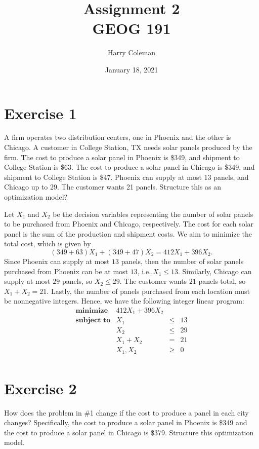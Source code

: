 \documentclass[12pt]{article}
\title{Assignment 2\\
    \large GEOG 191
}
\author{Harry Coleman}
\date{January 18, 2021}
\newenvironment{problem}
    {\begin{lrbox}{\mybox}\begin{minipage}{0.98\textwidth}}
    {\end{minipage}\end{lrbox}\begin{center}\framebox[\textwidth]{\usebox{\mybox}}\end{center}}
\theoremstyle{definition}
\begin{document}
\maketitle

\section*{Exercise 1}
\begin{problem}
    A firm operates two distribution centers, one in Phoenix and the other is Chicago. A customer in College Station, TX needs solar panels produced by the firm. The cost to produce a solar panel in Phoenix is \$349, and shipment to College Station is \$63. The cost to produce a solar panel in Chicago is \$349, and shipment to College Station is \$47. Phoenix can supply at most 13 panels, and Chicago up to 29. The customer wants 21 panels. Structure this as an optimization model? 
\end{problem}

Let $X_1$ and $X_2$ be the decision variables representing the number of solar panels to be purchased from Phoenix and Chicago, respectively. The cost for each solar panel is the sum of the production and shipment costs. We aim to minimize the total cost, which is given by
\[
    (349 + 63)X_1 + (349 + 47)X_2 = 412X_1 + 396X_2.
\]
Since Phoenix can supply at most $13$ panels, then the number of solar panels purchased from Phoenix can be at most $13$, i.e.,$X_1 \leq 13$. Similarly, Chicago can supply at most $29$ panels, so $X_2 \leq 29$. The customer wants $21$ panels total, so $X_1 + X_2 = 21$. Lastly, the number of panels purchased from each location must be nonnegative integers. Hence, we have the following integer linear program:
\[
    \begin{array}{lrcr}
        \textbf{minimize}   & 412X_1 + 396X_2 & & \\
        \textbf{subject to} & X_1 & \leq & 13 \\
                            & X_2 & \leq & 29 \\
                            & X_1 + X_2 & = & 21 \\
                            & X_1, X_2 & \geq & 0 \\
    \end{array}
\]

\newpage
\section*{Exercise 2}
\begin{problem}
    How does the problem in \#1 change if the cost to produce a panel in each city changes? Specifically, the cost to produce a solar panel in Phoenix is \$349 and the cost to produce a solar panel in Chicago is \$379. Structure this optimization model.
\end{problem}
\end{document}
